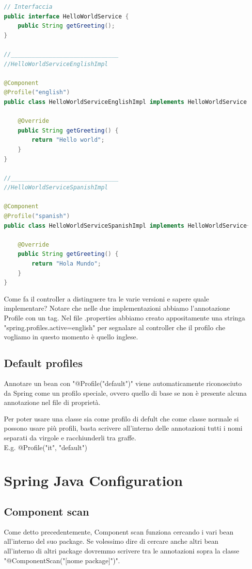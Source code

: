 \documentclass[11pt,a4paper]{book}
\begin{document}
\begin{lstlisting}[language = Java]
// Interfaccia
public interface HelloWorldService {
    public String getGreeting();
}

//_______________________________
//HelloWorldServiceEnglishImpl

@Component
@Profile("english")
public class HelloWorldServiceEnglishImpl implements HelloWorldService {

    @Override
    public String getGreeting() {
        return "Hello world";
    }
}

//_______________________________
//HelloWorldServiceSpanishImpl

@Component
@Profile("spanish")
public class HelloWorldServiceSpanishImpl implements HelloWorldService{

    @Override
    public String getGreeting() {
        return "Hola Mundo";
    }
}

\end{lstlisting}
Come fa il controller a distinguere tra le varie versioni e sapere quale implementare? Notare che nelle due implementazioni abbiamo l'annotazione Profile con un tag. Nel file .properties abbiamo creato appositamente una stringa "spring.profiles.active=english" per segnalare al controller che il profilo che vogliamo in questo momento è quello inglese.

\subsection{Default profiles}
Annotare un bean con "@Profile("default")" viene automaticamente riconosciuto da Spring come un profilo speciale, ovvero quello di base se non è presente alcuna annotazione nel file di proprietà.

Per poter usare una classe sia come profilo di defult che come classe normale si possono usare più profili, basta scrivere all'interno delle annotazioni tutti i nomi separati da virgole e racchiunderli tra graffe. \\ E.g. @Profile({"it", "default"})


\section{Spring Java Configuration}
\subsection{Component scan}
Come detto precedentemente, Component scan funziona cercando i vari bean all'interno del suo package. Se volessimo dire di cercare anche altri bean all'interno di altri package dovremmo scrivere tra le annotazioni sopra la classe "@ComponentScan("[nome package]")".
\end{document}
